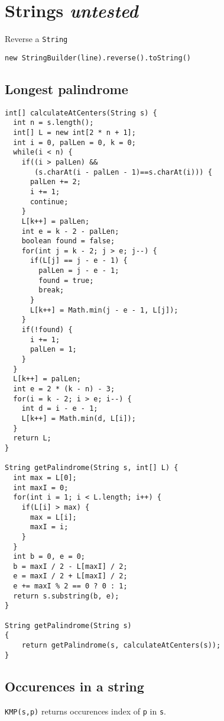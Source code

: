 \section{Strings {\footnotesize \textit{untested}}}
Reverse a \lstinline|String|
\begin{lstlisting}
new StringBuilder(line).reverse().toString()
\end{lstlisting}
\subsection{Longest palindrome}
\begin{lstlisting}
int[] calculateAtCenters(String s) {
  int n = s.length();
  int[] L = new int[2 * n + 1];
  int i = 0, palLen = 0, k = 0;
  while(i < n) {
    if((i > palLen) &&
       (s.charAt(i - palLen - 1)==s.charAt(i))) {
      palLen += 2;
      i += 1;
      continue;
    }
    L[k++] = palLen;
    int e = k - 2 - palLen;
    boolean found = false;
    for(int j = k - 2; j > e; j--) {
      if(L[j] == j - e - 1) {
        palLen = j - e - 1;
        found = true;
        break;
      }
      L[k++] = Math.min(j - e - 1, L[j]);
    }
    if(!found) {
      i += 1;
      palLen = 1;
    }
  }
  L[k++] = palLen;
  int e = 2 * (k - n) - 3;
  for(i = k - 2; i > e; i--) {
    int d = i - e - 1;
    L[k++] = Math.min(d, L[i]);
  }
  return L;
}

String getPalindrome(String s, int[] L) {
  int max = L[0];
  int maxI = 0;
  for(int i = 1; i < L.length; i++) {
    if(L[i] > max) {
      max = L[i];
      maxI = i;
    }
  }
  int b = 0, e = 0;
  b = maxI / 2 - L[maxI] / 2;
  e = maxI / 2 + L[maxI] / 2;
  e += maxI % 2 == 0 ? 0 : 1;
  return s.substring(b, e);
}

String getPalindrome(String s)
{
	return getPalindrome(s, calculateAtCenters(s));
}
\end{lstlisting}

\subsection{Occurences in a string}

\lstinline{KMP(s,p)} returns occurences index of
\lstinline{p} in \lstinline{s}.


